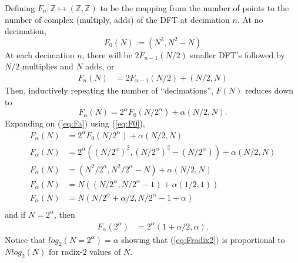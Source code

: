\documentclass{article}
\begin{document}
Defining $F_n : \mathbb{Z} \mapsto (\mathbb{Z}, \mathbb{Z})$ to be the mapping from the number of points to the number of complex (multiply, adds) of the DFT at decimation $n$. At no decimation,
%
\begin {equation} \label {eq:F0}
F_0 (N) := (N^2, N^2 - N)
\end {equation}
%
At each decimation $n$, there will be $2 F_{n-1}(N/2)$ smaller DFT's followed by $N/2$ multiplies and $N$ adds, or
%
\begin {equation} \label {eq:Fn}
\begin {aligned}
F_n (N) &= 2 F_{n - 1} (N/2) + (N/2, N)
\end {aligned}
\end {equation}
%
Then, inductively repeating the number of ``decimations'', $F(N)$ reduces down to
%
\begin {equation} \label {eq:Fa}
F_\alpha (N) = 2^\alpha F_0 (N/2^\alpha) + \alpha (N/2, N).
\end {equation}
%
Expanding on (\ref{eq:Fa}) using (\ref{eq:F0}),
%
\begin {equation}
\begin {aligned}
F_\alpha (N) &= 2^\alpha F_0 (N/2^\alpha) + \alpha (N/2, N) \\
F_\alpha (N) &= 2^\alpha ((N/2^\alpha)^2, (N/2^\alpha)^2 - (N/2^\alpha)) + \alpha (N/2, N) \\
F_\alpha (N) &= (N^2/2^\alpha, N^2/2^\alpha - N) + \alpha (N/2, N) \\
F_\alpha (N) &= N \left((N/2^\alpha, N/2^\alpha - 1) + \alpha (1/2, 1)\right) \\
F_\alpha (N) &= N (N/2^\alpha + \alpha/2, N/2^\alpha - 1 + \alpha) \\
\end {aligned}
\end {equation}
%
and if $N = 2^\alpha$, then
%
\begin {equation} \label {eq:Fradix2}
\begin {aligned}
F_\alpha (2^\alpha) &= 2^{\alpha} (1 + \alpha/2, \alpha).
\end {aligned}
\end {equation}
%
Notice that $log_2 (N = 2^\alpha) = \alpha$ showing that (\ref{eq:Fradix2}) is proportional to $N log_2 (N)$ for radix-$2$ values of $N$.
%
\end{document}
